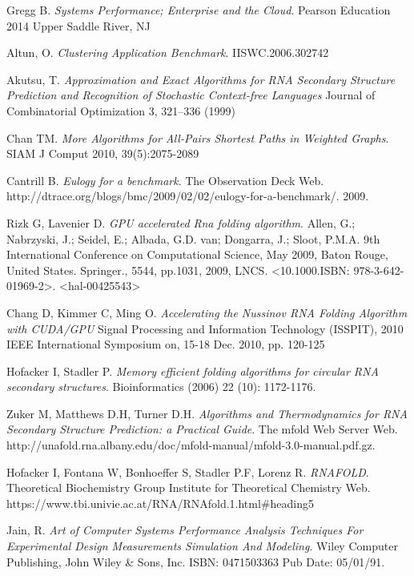 \documentclass[12pt]{article}
\begin{document}
\begin{thebibliography}{56}
Gregg B.
\textit{Systems Performance; Enterprise and the Cloud}.
Pearson Education 2014 Upper Saddle River, NJ

Altun, O.
\textit{Clustering Application Benchmark}.
IISWC.2006.302742

Akutsu, T.
\textit{Approximation and Exact Algorithms for RNA
Secondary Structure Prediction and Recognition
of Stochastic Context-free Languages}
Journal of Combinatorial Optimization 3, 321–336 (1999)

Chan TM.
\textit{More Algorithms for All-Pairs Shortest Paths in Weighted
Graphs}.
SIAM J Comput 2010, 39(5):2075-2089

Cantrill B.
\textit{Eulogy for a benchmark}.
The Observation Deck Web. http://dtrace.org/blogs/bmc/2009/02/02/eulogy-for-a-benchmark/.
2009.

Rizk G, Lavenier D.
\textit{GPU accelerated Rna folding algorithm}.
Allen, G.; Nabrzyski, J.; Seidel, E.; Albada, G.D. van; Dongarra, J.; Sloot, P.M.A. 9th International Conference on Computational Science, May 2009, Baton Rouge, United States. Springer., 5544, pp.1031, 2009, LNCS. <10.1000.ISBN: 978-3-642-01969-2>. <hal-00425543>

Chang D, Kimmer C, Ming O.
\textit{Accelerating the Nussinov RNA Folding Algorithm with CUDA/GPU}
Signal Processing and Information Technology (ISSPIT), 2010 IEEE International Symposium on, 15-18 Dec. 2010, pp. 120-125

Hofacker I, Stadler P.
\textit{Memory efficient folding algorithms for circular RNA secondary structures}.
Bioinformatics (2006) 22 (10): 1172-1176.

Zuker M, Matthews D.H, Turner D.H.
\textit{Algorithms and Thermodynamics for RNA
Secondary Structure Prediction:
a Practical Guide}.
The mfold Web Server Web. http://unafold.rna.albany.edu/doc/mfold-manual/mfold-3.0-manual.pdf.gz.

Hofacker I, Fontana W, Bonhoeffer S, Stadler P.F, Lorenz R.
\textit{RNAFOLD}.
Theoretical Biochemistry Group Institute for Theoretical Chemistry Web. https://www.tbi.univie.ac.at/RNA/RNAfold.1.html\#heading5

Jain, R.
\textit{Art of Computer Systems Performance Analysis Techniques For Experimental Design Measurements Simulation And Modeling}.
Wiley Computer Publishing, John Wiley \& Sons, Inc.
ISBN: 0471503363 Pub Date: 05/01/91.

\end{thebibliography}
\end{document}
